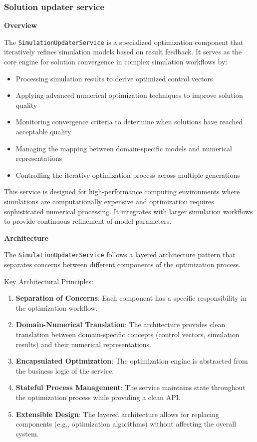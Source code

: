 \subsubsection{Solution updater service}
\textbf{Overview}

The \texttt{SimulationUpdaterService} is a specialized optimization component that iteratively refines simulation models based on result feedback. It serves as the core engine for solution convergence in complex simulation workflows by:

\begin{itemize}
	\item Processing simulation results to derive optimized control vectors
	\item Applying advanced numerical optimization techniques to improve solution quality
	\item Monitoring convergence criteria to determine when solutions have reached acceptable quality
	\item Managing the mapping between domain-specific models and numerical representations
	\item Controlling the iterative optimization process across multiple generations
\end{itemize}

This service is designed for high-performance computing environments where simulations are computationally expensive and optimization requires sophisticated numerical processing. It integrates with larger simulation workflows to provide continuous refinement of model parameters.

\bigskip
\textbf{Architecture}

The \texttt{SimulationUpdaterService} follows a layered architecture pattern that separates concerns between different components of the optimization process.

Key Architectural Principles:
\begin{enumerate}
	\item \textbf{Separation of Concerns}: Each component has a specific responsibility in the optimization workflow.
	
	\item \textbf{Domain-Numerical Translation}: The architecture provides clean translation between domain-specific concepts (control vectors, simulation results) and their numerical representations.
	
	\item \textbf{Encapsulated Optimization}: The optimization engine is abstracted from the business logic of the service.
	
	\item \textbf{Stateful Process Management}: The service maintains state throughout the optimization process while providing a clean API.
	
	\item \textbf{Extensible Design}: The layered architecture allows for replacing components (e.g., optimization algorithms) without affecting the overall system.
\end{enumerate}

